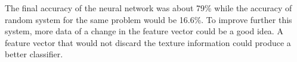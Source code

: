 \documentclass{IEEEtran}
\begin{document}
The final accuracy of the neural network was about 79\% while the accuracy of random system for the same problem would
be 16.6\%. To improve further this system, more data of a change in the feature vector could be a good idea. A
feature vector that would not discard the texture information could produce a better classifier.
\end{document}
